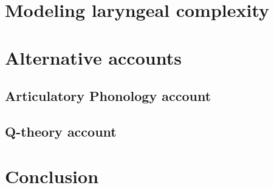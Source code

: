 \section{Modeling laryngeal complexity}\label{sec:modeling_lc}

\section{Alternative accounts}\label{sec:alternative_accounts}

\subsection{Articulatory Phonology account}\label{sec:ap_account}

\subsection{Q-theory account}\label{sec:q_theory_account}


\section{Conclusion}\label{sec:conclusion_of_modeling_lc}
